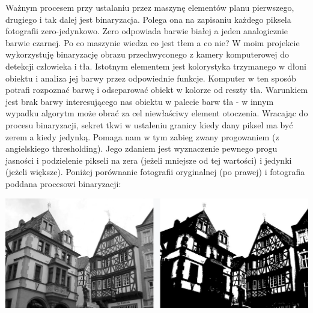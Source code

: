 \documentclass{article}
\begin{document}
\par
Ważnym procesem przy ustalaniu przez maszynę elementów planu pierwszego, drugiego i tak dalej jest binaryzacja. Polega ona na zapisaniu każdego piksela fotografii zero-jedynkowo. Zero odpowiada barwie białej a jeden analogicznie barwie czarnej. Po co maszynie wiedza co jest tłem a co nie? W moim projekcie wykorzystuję binaryzację obrazu przechwyconego z kamery komputerowej do detekcji człowieka i tła. Istotnym elementem jest kolorystyka trzymanego w dłoni obiektu i analiza jej barwy przez odpowiednie funkcje. Komputer w ten sposób potrafi rozpoznać barwę i odseparować obiekt w kolorze od reszty tła. Warunkiem jest brak barwy interesującego nas obiektu w palecie barw tła - w innym wypadku algorytm może obrać za cel niewłaściwy element otoczenia. Wracając do procesu binaryzacji, sekret tkwi w ustaleniu granicy kiedy dany piksel ma być zerem a kiedy jedynką. Pomaga nam w tym zabieg zwany progowaniem (z angielskiego thresholding). Jego zdaniem jest wyznaczenie pewnego progu jasności i podzielenie pikseli na zera (jeżeli mniejsze od tej wartości) i jedynki (jeżeli większe). Poniżej porównanie fotografii oryginalnej (po prawej) i fotografia poddana procesowi binaryzacji:
\begin{center}
	\includegraphics[width=15cm]{binary}
\end{center}
\end{document}
